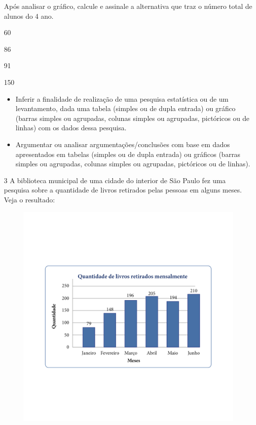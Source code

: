 Após analisar o gráfico, calcule e assinale a alternativa que traz o
número total de alunos do 4 ano.

\begin{escolha}
\item
  60
\item
  86
\item
  91
\item
  150
\end{escolha}


\begin{itemize}
\item Inferir a finalidade de realização de uma pesquisa estatística ou de
um levantamento, dada uma tabela (simples ou de dupla entrada) ou
gráfico (barras simples ou agrupadas, colunas simples ou agrupadas,
pictóricos ou de linhas) com os dados dessa pesquisa.

\item Argumentar ou analisar argumentações/conclusões com base em dados
apresentados em tabelas (simples ou de dupla entrada) ou gráficos
(barras simples ou agrupadas, colunas simples ou agrupadas, pictóricos
ou de linhas).
\end{itemize}


\num{3} A biblioteca municipal de uma cidade do interior de São Paulo fez
uma pesquisa sobre a quantidade de livros retirados pelas pessoas em
alguns meses. Veja o resultado:

\begin{figure}[htpb!]
\includegraphics[width=\textwidth]{../ilustracoes/MAT5/SAEB_5ANO_MAT_figura111.png}
\end{figure}

